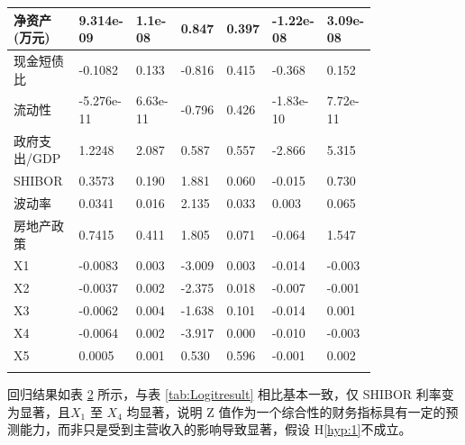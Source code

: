 \begin{table}
\begin{longtable}{p{0.18\linewidth}p{0.1\linewidth}p{0.1\linewidth}p{0.1\linewidth}p{0.1\linewidth}p{0.12\linewidth}p{0.1\linewidth}}
		净资产(万元)      & 9.314e-09     & 1.1e-08          & 0.847      & 0.397          & -1.22e-08       & 3.09e-08        \\ \hline
		现金短债比        & -0.1082       & 0.133            & -0.816     & 0.415          & -0.368          & 0.152           \\ \hline
		流动性            & -5.276e-11    & 6.63e-11         & -0.796     & 0.426          & -1.83e-10       & 7.72e-11        \\ \hline
		政府支出/GDP      & 1.2248        & 2.087            & 0.587      & 0.557          & -2.866          & 5.315           \\ \hline
		SHIBOR            & 0.3573        & 0.190            & 1.881      & 0.060          & -0.015          & 0.730           \\ \hline
		波动率            & 0.0341        & 0.016            & 2.135      & 0.033          & 0.003           & 0.065           \\ \hline
		房地产政策        & 0.7415        & 0.411            & 1.805      & 0.071          & -0.064          & 1.547           \\ \hline
		X1                & -0.0083       & 0.003            & -3.009     & 0.003          & -0.014          & -0.003          \\ \hline
		X2                & -0.0037       & 0.002            & -2.375     & 0.018          & -0.007          & -0.001          \\ \hline
		X3                & -0.0062       & 0.004            & -1.638     & 0.101          & -0.014          & 0.001           \\ \hline
		X4                & -0.0064       & 0.002            & -3.917     & 0.000          & -0.010          & -0.003          \\ \hline
		X5                & 0.0005        & 0.001            & 0.530      & 0.596          & -0.001          & 0.002           \\ \hline
		\label{tab:robust}
	\end{longtable}
\end{table}
回归结果如表 \ref{tab:robust} 所示，与表 \ref{tab:Logitresult} 相比基本一致，仅 SHIBOR 利率变为显著，且\(X_1\) 至 \(X_4\) 均显著，说明 Z 值作为一个综合性的财务指标具有一定的预测能力，而非只是受到主营收入的影响导致显著，假设 H\ref{hyp:1}不成立。
